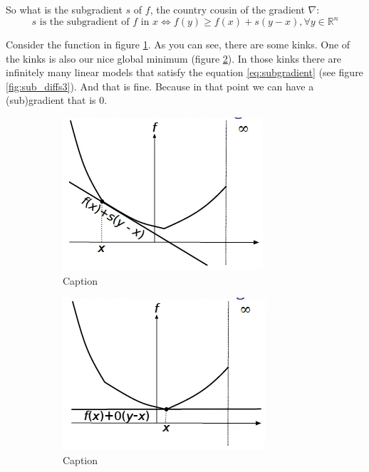 \par So what is the subgradient $s$ of $f$, the country cousin of the gradient $\nabla$:
\begin{equation}
    s \mbox{ is the subgradient of } f \mbox{ in } x \iff f(y) \geq f(x) + s(y-x), \forall y \in \mathbb{R}^n
    \label{eq:subgradient}
\end{equation}
\par Consider the function in figure \ref{fig:sub_diffs1}. As you can see, there are some kinks. One of the kinks is also our nice global minimum (figure \ref{fig:sub_diffs2}). In those kinks there are infinitely many linear models that satisfy the equation \ref{eq:subgradient} (see figure \ref{fig:sub_diffs3}). And that is fine. Because in that point we can have a (sub)gradient that is 0.
\begin{figure}
    \centering
    \begin{subfigure}{0.31\textwidth}
        \centering
        \includegraphics[scale=0.4]{figures/2/sub-diffs/sub_diffs1.png}
        \caption{Caption}
        \label{fig:sub_diffs1}
    \end{subfigure}
    \begin{subfigure}{0.31\textwidth}
        \centering
        \includegraphics[scale=0.4]{figures/2/sub-diffs/sub_diffs2.png}
        \caption{Caption}
        \label{fig:sub_diffs2}
    \end{subfigure}
    \begin{subfigure}{0.31\textwidth}

\end{subfigure}
\end{figure}
